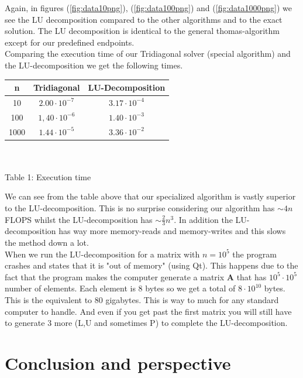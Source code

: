 \documentclass{article}
\begin{document}
  Again, in figures (\ref{fig:data10png}), (\ref{fig:data100png}) and (\ref{fig:data1000png}) we see the LU decomposition compared to the other algorithms and to the exact solution. The LU decomposition is identical to the general thomas-algorithm except for our predefined endpoints.\\
  Comparing the execution time of our Tridiagonal solver (special algorithm) and the LU-decomposition we get the following times.
  \begin{center} \label{tab:exec_time}
      \begin{tabular}{|c|c|c|}
        \hline
        n    &   Tridiagonal      &  LU-Decomposition  \\
        \hline\hline
        10   & $2.00\cdot10^{-7}$ & $3.17\cdot10^{-4}$ \\
        100  & $1,40\cdot10^{-6}$ & $1.40\cdot10^{-3}$ \\
        1000 & $1.44\cdot10^{-5}$ & $3.36\cdot10^{-2}$ \\
        \hline
      \end{tabular} \\
      \hspace{0pt}\\
      Table 1: Execution time
  \end{center}
  We can see from the table above that our specialized algorithm is vastly superior to the LU-decomposition. This is no surprise considering our algorithm has $\sim4n$ FLOPS whilst the LU-decomposition has $\sim\frac{2}{3}n^3$. In addition the LU-decomposition has way more memory-reads and memory-writes and this slows the method down a lot. \\

  When we run the LU-decomposition for a matrix with $n = 10^5$ the program crashes and states that it is "out of memory" (using Qt). This happens due to the fact that the program makes the computer generate a matrix \textbf{A} that has $10^5 \cdot 10^5$ number of elements. Each element is 8 bytes so we get a total of $8 \cdot 10^{10}$ bytes. This is the equivalent to $80$ gigabytes. This is way to much for any standard computer to handle. And even if you get past the first matrix you will still have to generate 3 more (L,U and sometimes P) to complete the LU-decomposition.



\vspace{1cm}

\section{Conclusion and perspective} \label{Conclusion}
\end{document}
